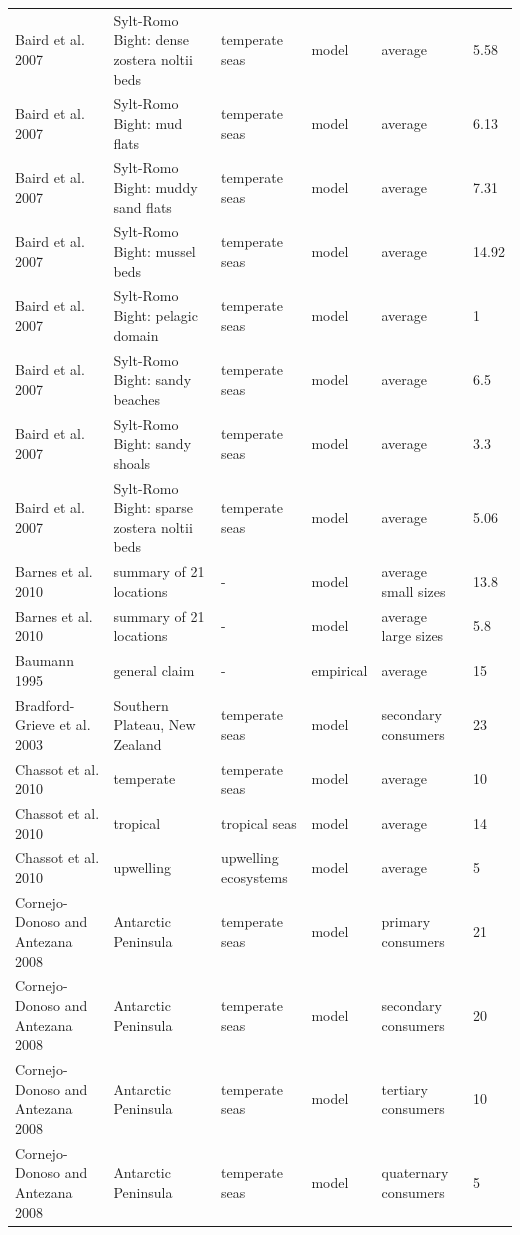 \documentclass[oneside,12pt,final]{sty/ucthesis-CA2012}
\begin{document}
\begin{mainmatter}
\begin{longtable} {p{4cm}p{3cm}p{2cm}lp{2cm}p{2cm}}
    Baird et al. 2007  & Sylt-Romo Bight: dense zostera noltii beds & temperate seas & model & average & 5.58 \\
    Baird et al. 2007  & Sylt-Romo Bight: mud flats & temperate seas & model & average & 6.13 \\
    Baird et al. 2007   & Sylt-Romo Bight: muddy sand flats & temperate seas & model & average & 7.31 \\
    Baird et al. 2007   & Sylt-Romo Bight: mussel beds & temperate seas & model & average & 14.92 \\
    Baird et al. 2007  & Sylt-Romo Bight: pelagic domain & temperate seas & model & average & 1 \\
    Baird et al. 2007  & Sylt-Romo Bight: sandy beaches & temperate seas & model & average & 6.5 \\
    Baird et al. 2007  & Sylt-Romo Bight: sandy shoals & temperate seas & model & average & 3.3 \\
    Baird et al. 2007   & Sylt-Romo Bight: sparse zostera noltii beds & temperate seas & model & average & 5.06 \\
    Barnes et al.  2010  & summary of 21 locations & -    & model & average small sizes & 13.8 \\
    Barnes et al.  2010   & summary of 21 locations & -    & model & average large sizes & 5.8 \\
    Baumann 1995   & general claim & -    & empirical & average & 15 \\
    Bradford-Grieve et al. 2003   & Southern Plateau, New Zealand & temperate seas & model & secondary consumers & 23 \\
    Chassot et al. 2010  & temperate & temperate seas & model & average & 10 \\
    Chassot et al. 2010   & tropical & tropical seas & model & average & 14 \\
    Chassot et al. 2010  & upwelling & upwelling ecosystems & model & average & 5 \\
    Cornejo-Donoso and Antezana 2008   & Antarctic Peninsula & temperate seas & model & primary consumers & 21 \\
    Cornejo-Donoso and Antezana 2008  & Antarctic Peninsula & temperate seas & model & secondary consumers & 20 \\
    Cornejo-Donoso and Antezana 2008  & Antarctic Peninsula & temperate seas & model & tertiary consumers & 10 \\
    Cornejo-Donoso and Antezana 2008   & Antarctic Peninsula & temperate seas & model & quaternary consumers & 5 \\

\end{longtable}
\end{mainmatter}
\end{document}
